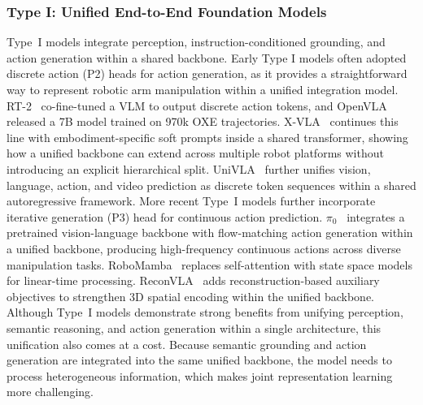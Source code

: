 \documentclass[acmsmall,screen,review]{acmart}
\begin{document}
\subsubsection{Type I\@: Unified End-to-End Foundation Models}\label{subsec:e2emodels}

Type~I models integrate perception, instruction-conditioned grounding, and action generation within a shared backbone.
Early Type I models often adopted discrete action (P2) heads for action generation, as it provides a straightforward way to represent robotic arm manipulation within a unified integration model.
RT-2~\cite{brohan2023rt2} co-fine-tuned a VLM to output discrete action tokens, 
and OpenVLA~\cite{kim2024openvla} released a 7B model trained on 970k OXE trajectories. 
X-VLA~\cite{zheng2026xvla} continues this line with embodiment-specific soft prompts inside a shared transformer, showing how a unified backbone can extend across multiple robot platforms without introducing an explicit hierarchical split. 
UniVLA~\cite{wang2026unified} further unifies vision, language, action, and video prediction as discrete token sequences within a shared autoregressive framework.
More recent Type~I models further incorporate iterative generation (P3) head for continuous action prediction.
$\pi_0$~\cite{black2024pi0} integrates a pretrained vision-language backbone with flow-matching action generation within a unified backbone, producing high-frequency continuous actions across diverse manipulation tasks.
RoboMamba~\cite{liu2024robomamba} replaces self-attention with state space models for linear-time processing. 
ReconVLA~\cite{song2025reconvla} adds reconstruction-based auxiliary objectives to strengthen 3D spatial encoding within the unified backbone.
Although Type~I models demonstrate strong benefits from unifying perception, semantic reasoning, and action generation within a single architecture, this unification also comes at a cost.
Because semantic grounding and action generation are integrated into the same unified backbone, the model needs to process heterogeneous information, which makes joint representation learning more challenging.
\end{document}
